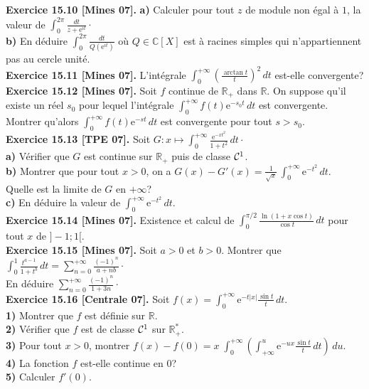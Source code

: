 \documentclass[a4paper,12pt,francais]{article}
\newcommand{\field}[1]{\mathbb{#1}}
\newcommand{\R}{\field{R}}
\newcommand{\C}{\field{C}}
\newcommand{\e}{\mbox{e}}
\begin{document}
\noindent
{\bf Exercice 15.10 [Mines 07].} {\bf a)} Calculer pour tout $z$ de module non égal à $1$, la valeur de $\displaystyle \int_0^{2\pi} \frac{dt}{z+\e^{it}}\cdot$\\
{\bf b)} En déduire $\displaystyle \int_0^{2\pi} \frac{dt}{Q(\e^{it})}$ où $Q \in \C[X]$ est à racines simples qui n'appartiennent pas au cercle unité.\\

\noindent
{\bf Exercice 15.11 [Mines 07].} L'intégrale $\displaystyle \int_0^{+\infty} \left(\frac{\arctan t}{t}\right)^2\, dt$ est-elle convergente?\\

\noindent
{\bf Exercice 15.12 [Mines 07].} Soit $f$ continue de $\R_+$ dans $\R$. On suppose qu'il existe un réel $s_0$ pour lequel l'intégrale $\int_0^{+\infty} f(t) \e^{-s_0t}\, dt$ est convergente. Montrer qu'alors $\int_0^{+\infty} f(t) \e^{-s t}\, dt$ est convergente pour tout $s>s_0$.\\

\noindent
{\bf Exercice 15.13 [TPE 07].} Soit $\displaystyle G:x\mapsto \int_0^{+\infty} \frac{\e^{-xt^2}}{1+t^2}\, dt\cdot$\\
\indent
{\bf a)} Vérifier que $G$ est continue sur $\R_+$ puis de classe ${\cal{C}}^1$.\\
\indent
{\bf b)} Montrer que pour tout $x>0$, on a $\displaystyle G(x)-G'(x)=\frac{1}{\sqrt{x}}\, \int_0
^{+\infty} \e^{-t^2}\, dt$.\\
\indent
Quelle est la limite de $G$ en $+\infty$?\\
\indent
{\bf c)} En déduire la valeur de $\displaystyle \int_0^{+\infty} \e^{-t^2}\, dt$.\\

\noindent
{\bf Exercice 15.14 [Mines 07].} Existence et calcul de $\displaystyle \int_0^{\pi/2} \frac{\ln ( 1+x \cos t)}{\cos t}\, dt$ pour tout $x$ de $]-1;1[$.\\

\noindent
{\bf Exercice 15.15 [Mines 07].} Soit $a>0$ et $b>0$. Montrer que $\displaystyle \int_0^1 \frac{t^{a-1}}{1+t^b} \, dt =\sum_{n=0}^{+ \infty} \frac{(-1)^n}{a+nb} \cdot$\\
En déduire $\displaystyle \sum_{n=0}^{+ \infty} \frac{(-1)^n}{1+3n} \cdot$\\

\noindent
{\bf Exercice 15.16 [Centrale 07].} Soit $\displaystyle f(x)=\int_0^{+\infty} \e^{-t|x|} \frac{\sin t }{t} \, dt.$\\
\indent
{\bf 1)} Montrer que $f$ est définie sur $\R$.\\
\indent
{\bf 2)} Vérifier que $f$ est de classe ${\cal{C}}^1$ sur $\R_+^*$.\\
\indent
{\bf 3)} Pour tout $x>0$, montrer $f(x)-f(0)=x \displaystyle \;  \int_0^{+\infty} \left( \int_{+\infty}^u \e^{-ux} \frac{\sin t}{t}\, dt\right) \, du$.\\
\indent
{\bf 4)} La fonction $f$ est-elle continue en $0$?\\
\indent
{\bf 5)} Calculer $f'(0)$.\\
\end{document}
